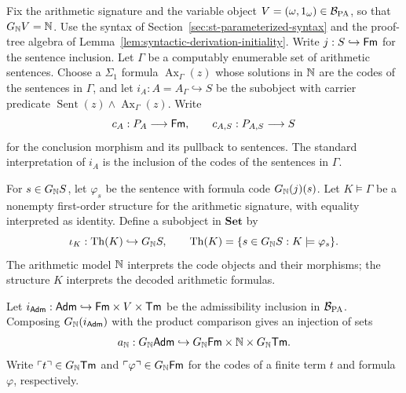 Fix the arithmetic signature and the variable object
$V=(\omega,1_\omega)\in\mathcal B_{\mathrm{PA}}$, so that
$G_{\mathbb N}V=\mathbb N$. Use the syntax of
Section~\ref{sec:st-parameterized-syntax} and the proof-tree
algebra of Lemma~\ref{lem:syntactic-derivation-initiality}. Write $j:S\hookrightarrow\mathsf{Fm}$ for the sentence inclusion. Let $\Gamma$ be
a computably enumerable set of arithmetic sentences. Choose a
$\Sigma_1$ formula $\operatorname{Ax}_\Gamma(z)$ whose solutions
in $\mathbb N$ are the codes of the sentences in $\Gamma$, and let $i_A:A=A_\Gamma\hookrightarrow S$
be the subobject with carrier predicate
$\operatorname{Sent}(z)\land\operatorname{Ax}_\Gamma(z)$. Write
\[
 c_A:P_A\longrightarrow\mathsf{Fm},\qquad
 c_{A,S}:P_{A,S}\longrightarrow S
\]
for the conclusion morphism and its pullback to sentences.
The standard interpretation of $i_A$ is the inclusion of the
codes of the sentences in $\Gamma$.

For $s\in G_{\mathbb N}S$, let $\varphi_s$ be the sentence with formula code
$G_{\mathbb N}(j)(s)$. Let $K\models\Gamma$ be a nonempty first-order
structure for the arithmetic signature, with equality interpreted
as identity. Define a subobject in $\mathbf{Set}$ by
\[
 \iota_K:\operatorname{Th}(K)\hookrightarrow G_{\mathbb N}S,
 \qquad
 \operatorname{Th}(K)=\{s\in G_{\mathbb N}S:K\models\varphi_s\}.
\]
The arithmetic model $\mathbb N$ interprets the code objects and their
morphisms; the structure $K$ interprets the decoded arithmetic
formulas.

Let $i_{\mathsf{Adm}}:\mathsf{Adm}\hookrightarrow\mathsf{Fm}\times V\times\mathsf{Tm}$
be the admissibility inclusion in $\mathcal B_{\mathrm{PA}}$.
Composing $G_{\mathbb N}(i_{\mathsf{Adm}})$ with the product
comparison gives an injection of sets
\[
 a_{\mathbb N}:G_{\mathbb N}\mathsf{Adm}\hookrightarrow
             G_{\mathbb N}\mathsf{Fm}\times\mathbb N\times G_{\mathbb N}\mathsf{Tm}.
\]
Write $\ulcorner t\urcorner\in G_{\mathbb N}\mathsf{Tm}$ and
$\ulcorner\varphi\urcorner\in G_{\mathbb N}\mathsf{Fm}$ for the codes of a finite term
$t$ and formula $\varphi$, respectively.

